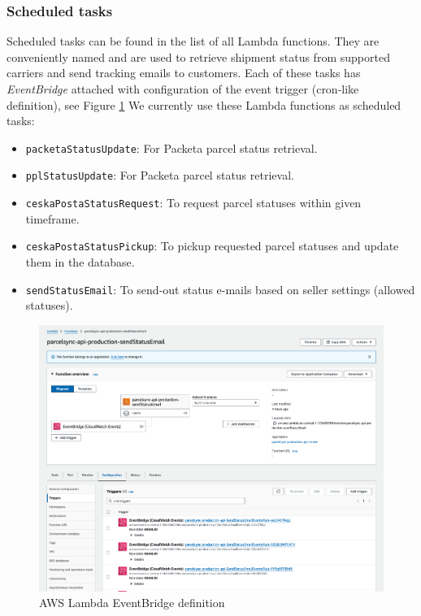 \subsubsection{Scheduled tasks}
\label{attachments:admin-manual-lambda.scheduled-tasks}
Scheduled tasks can be found in the list of all Lambda functions.
They are conveniently named and are used to retrieve shipment status from supported carriers and send tracking emails to customers.
Each of these tasks has \textit{EventBridge} attached with configuration of the event trigger (cron-like definition), see Figure \ref{img:admin-manual-aws.lambda.eventbridge}
We currently use these Lambda functions as scheduled tasks:
\begin{itemize}
    \item \texttt{packetaStatusUpdate}: For Packeta parcel status retrieval.
    \item \texttt{pplStatusUpdate}: For Packeta parcel status retrieval.
    \item \texttt{ceskaPostaStatusRequest}: To request parcel statuses within given timeframe.
    \item \texttt{ceskaPostaStatusPickup}: To pickup requested parcel statuses and update them in the database.
    \item \texttt{sendStatusEmail}: To send-out status e-mails based on seller settings (allowed statuses).
\end{itemize}

\begin{figure}[H]\centering
\includegraphics[width=140mm]{img/docs/fig_aws_eventbridge.png}
\caption{AWS Lambda EventBridge definition}
\label{img:admin-manual-aws.lambda.eventbridge}
\end{figure}

